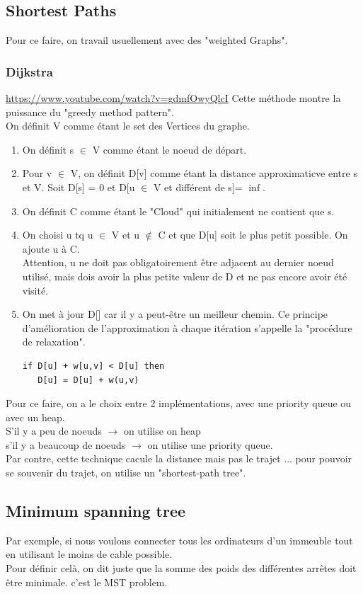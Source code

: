 \documentclass[a4paper]{article}
\begin{document}
\subsection{Shortest Paths}
Pour ce faire, on travail usuellement avec des "weighted Graphs".
\subsubsection{Dijkstra}
\url{https://www.youtube.com/watch?v=gdmfOwyQlcI}
Cette méthode montre la puissance du "greedy method pattern".\\
On définit V comme étant le set des Vertices du graphe.
\begin{enumerate}
\item On définit s $\in$ V comme étant le noeud de départ.
\item Pour v $\in$ V, on définit D[v] comme étant la distance approximaticve entre s et V. Soit D[s] = 0 et D[u $\in$ V et différent de s]= $\inf$.
\item On définit C comme étant le "Cloud" qui initialement ne contient que s.
\item On choisi u tq u $\in$ V et u $\notin$ C et que D[u] soit le plus petit possible. On ajoute u à C.\\
Attention, u ne doit pas obligatoirement être adjacent au dernier noeud utilisé, mais dois avoir la plus petite valeur de D et ne pas encore avoir été visité.
\item On met à jour D[] car il y a peut-être un meilleur chemin. Ce principe d'amélioration de l'approximation à chaque itération s'appelle la "procédure de relaxation".
\begin{verbatim}
if D[u] + w[u,v] < D[u] then
   D[u] = D[u] + w(u,v)
\end{verbatim}
\end{enumerate}

Pour ce faire, on a le choix entre 2 implémentations, avec une priority queue ou avec un heap.\\
S'il y a peu de noeuds $\rightarrow$ on utilise on heap\\
s'il y a beaucoup de noeuds $\rightarrow$ on utilise une priority queue.\\

Par contre, cette technique cacule la distance mais pas le trajet ... pour pouvoir se souvenir du trajet, on utilise un "shortest-path tree".

\subsection{Minimum spanning tree}
Par exemple, si nous voulons connecter tous les ordinateurs d'un immeuble tout en utilisant le moins de cable possible.\\
Pour définir celà, on dit juste que la somme des poids des différentes arrêtes doit être minimale. c'est le MST problem.
\end{document}
